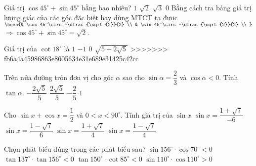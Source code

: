 \begin{ex}
	Giá trị $\cos 45^\circ+\sin 45^\circ$ bằng bao nhiêu?
	\choice
	{$1$}
	{\True $\sqrt{2}$}
	{$\sqrt{3}$}
	{$0$}
	\loigiai
	{Bằng cách tra bảng giá trị lượng giác của các góc đặc biệt hay dùng MTCT ta được $\heva{& \cos 45^\circ=\dfrac{\sqrt{2}}{2} \\
				& \sin 45^\circ=\dfrac{\sqrt{2}}{2} \\
			}$\\
		$\Rightarrow \cos 45^\circ+\sin 45^\circ=\sqrt{2}$.}
\end{ex}
\begin{ex}
	Giá trị của $\cot18^\circ$ là
	\choice
	{$1$}
	{$-1$}
	{$0$}
	{\True $\sqrt{5+2\sqrt{5}}$}
>>>>>>> fb6a4a45986863e8605634e31e689e31425c42cc
\end{ex}
\begin{ex}
	Trên nửa đường tròn đơn vị cho góc $\alpha$ sao cho $\sin\alpha=\dfrac{2}{3}$ và $\cos\alpha<0$. Tính $\tan\alpha$.
	\choice
	{\True $-\dfrac{2\sqrt{5}}{5}$}
	{$\dfrac{2\sqrt{5}}{5}$}
	{$-\dfrac{2}{5}$}
	{$1$}
\end{ex}
\begin{ex}
	Cho $\sin x+\cos x=\dfrac{1}{2}$ và $0<x<90^\circ$. Tính giá trị của $\sin x$
	\choice
	{$\sin x=\dfrac{1+\sqrt{7}}{-6}$}
	{$\sin x=\dfrac{1-\sqrt{7}}{6}$}
	{\True $\sin x=\dfrac{1+\sqrt{7}}{4}$}
	{$\sin x=\dfrac{1-\sqrt{7}}{4}$}
\end{ex}
\begin{ex}
	Chọn phát biểu đúng trong các phát biểu sau?
	\choice
	{$\sin 156^\circ\cdot\cos70^\circ<0$}
	{$\tan 137^\circ\cdot\tan 156^\circ<0$}
	{\True $\tan150^\circ\cdot\cot85^\circ<0$}
	{$\sin 110^\circ\cdot\cos 110^\circ>0$}
\end{ex}
